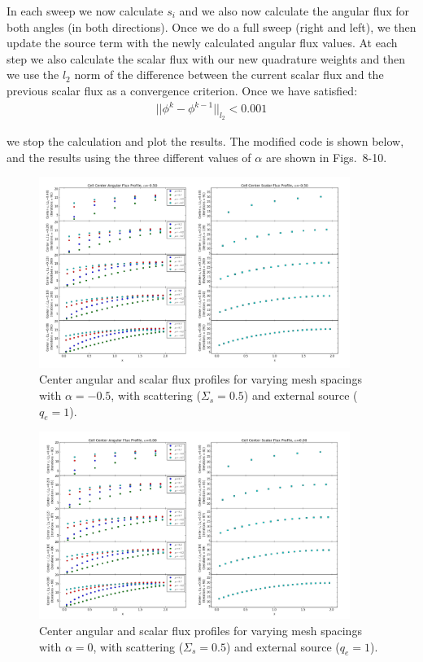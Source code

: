 \documentclass[10pt]{article}
\begin{document}
In each sweep we now calculate $s_i$ and we also now calculate the angular flux for both angles (in both directions). Once we do a full sweep (right and left), we then update the source term with the newly calculated angular flux values. At each step we also calculate the scalar flux with our new quadrature weights and then we use the $l_2$ norm of the difference between the current scalar flux and the previous scalar flux as a convergence criterion. Once we have satisfied:
%
\begin{align*}
    || \phi^k - \phi^{k-1} ||_{l_2} < 0.001
\end{align*}

we stop the calculation and plot the results. The modified code is shown below, and the results using the three different values of $\alpha$ are shown in Figs.~8-10.



\begin{figure}[H]
    \centering
    \includegraphics[width=0.9\textwidth]{Figures/FluxProfile_a=-05_source}
    \caption{Center angular and scalar flux profiles for varying mesh spacings with $\alpha = -0.5$, with scattering ($\Sigma_s = 0.5$) and external source ($q_e=1$).}
    \label{fig8}
\end{figure}

\begin{figure}[H]
    \centering
    \includegraphics[width=0.9\textwidth]{Figures/FluxProfile_a=0_source}
    \caption{Center angular and scalar flux profiles for varying mesh spacings with $\alpha = 0$, with scattering ($\Sigma_s = 0.5$) and external source ($q_e=1$).}
    \label{fig9}
\end{figure}
\end{document}
